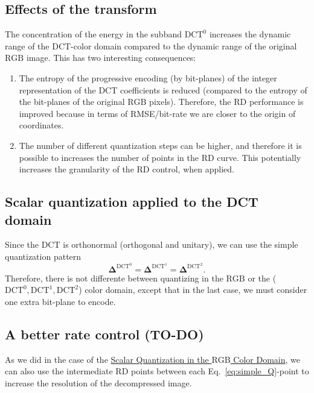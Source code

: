 \subsection{Effects of the transform}
The concentration of the energy in the subband $\text{DCT}^0$
increases the dynamic range of the DCT-color domain compared to the
dynamic range of the original $\text{RGB}$ image. This has two
interesting consequences:
\begin{enumerate}
\item The entropy of the progressive encoding (by bit-planes) of the
  integer representation of the DCT coefficients is reduced (compared
  to the entropy of the bit-planes of the original $\text{RGB}$
  pixels). Therefore, the RD performance is improved because in terms
  of RMSE/bit-rate we are closer to the origin of coordinates.
\item The number of different quantization steps can be higher, and
  therefore it is possible to increases the number of points in the RD
  curve. This potentially increases the granularity of the RD control,
  when applied.
\end{enumerate}

\subsection{Scalar quantization applied to the DCT domain}
Since the DCT is orthonormal (orthogonal and unitary), we can use the
simple quantization pattern
\begin{equation}
  \mathbf{\Delta}^{\text{DCT}^0} = \mathbf{\Delta}^{\text{DCT}^1} = \mathbf{\Delta}^{\text{DCT}^2}.
  \label{eq:simple_Q}
\end{equation}
Therefore, there is not differente between quantizing in the
$\text{RGB}$ or the ($\text{DCT}^0,\text{DCT}^1,\text{DCT}^2$) color
domain, except that in the last case, we must consider one extra
bit-plane to encode.

\subsection{A better rate control (TO-DO)}
\label{sec:increasing}
As we did in the case of the
\href{https://sistemas-multimedia.github.io/contents/RGB_SQ/}{Scalar
  Quantization in the $\text{RGB}$ Color Domain}, we can also use the
intermediate RD points between each Eq.~\eqref{eq:simple_Q}-point to
increase the resolution of the decompressed image.


